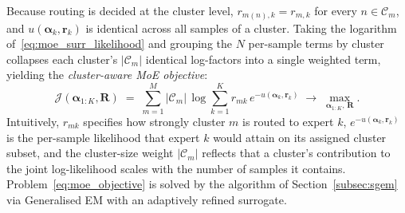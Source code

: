 Because routing is decided at the cluster level, $r_{m(n), k} = r_{m, k}$ for every $n \in \mathcal{C}_m$, and $u(\boldsymbol{\alpha}_k, \mathbf{r}_k)$ is identical across all samples of a cluster. Taking the logarithm of~\eqref{eq:moe_surr_likelihood} and grouping the $N$ per-sample terms by cluster collapses each cluster's $|\mathcal{C}_m|$ identical log-factors into a single weighted term, yielding the \emph{cluster-aware MoE objective}:
\begin{equation}
\label{eq:moe_objective}
\mathcal{J}(\boldsymbol{\alpha}_{1:K}, \mathbf{R}) \;=\;
\sum_{m=1}^{M} |\mathcal{C}_m|\,\log \sum_{k=1}^{K} r_{mk}\, e^{-u(\boldsymbol{\alpha}_k, \mathbf{r}_k)}
\;\to\; \max_{\boldsymbol{\alpha}_{1:K},\, \mathbf{R}}.
\end{equation}
Intuitively, $r_{mk}$ specifies how strongly cluster $m$ is routed to expert $k$, $e^{-u(\boldsymbol{\alpha}_k, \mathbf{r}_k)}$ is the per-sample likelihood that expert $k$ would attain on its assigned cluster subset, and the cluster-size weight $|\mathcal{C}_m|$ reflects that a cluster's contribution to the joint log-likelihood scales with the number of samples it contains. Problem~\eqref{eq:moe_objective} is solved by the algorithm of Section~\ref{subsec:sgem} via Generalised EM with an adaptively refined surrogate.
